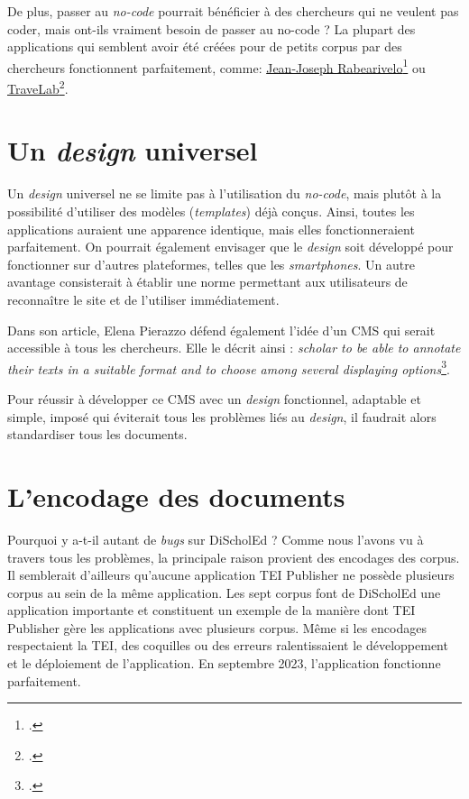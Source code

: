 De plus, passer au \textit{no-code} pourrait bénéficier à des chercheurs qui ne veulent pas coder, mais ont-ils vraiment besoin de passer au no-code ? La plupart des applications qui semblent avoir été créées pour de petits corpus par des chercheurs fonctionnent parfaitement, comme: \href{https://rabearivelo.huma-num.fr/exist/apps/jjr/index.html}{Jean-Joseph Rabearivelo\footcite{JJR}} ou \href{https://teipublisher.info/exist/apps/TraveLab/index.html}{TraveLab\footcite{TraveLab}}.

\section{Un \textit{design} universel} 

Un \textit{design} universel ne se limite pas à l'utilisation du \textit{no-code}, mais plutôt à la possibilité d'utiliser des modèles (\textit{templates}) déjà conçus. Ainsi, toutes les applications auraient une apparence identique, mais elles fonctionneraient parfaitement. On pourrait également envisager que le \textit{design} soit développé pour fonctionner sur d'autres plateformes, telles que les \textit{smartphones}. Un autre avantage consisterait à établir une norme permettant aux utilisateurs de reconnaître le site et de l'utiliser immédiatement.

Dans son article, Elena Pierazzo défend également l'idée d'un CMS qui serait accessible à tous les chercheurs. Elle le décrit ainsi : \og{}\textit{scholar to be able to annotate their texts in a suitable format and to choose among several displaying options}\fg{}\footcite{epapers4200}.

Pour réussir à développer ce CMS avec un \textit{design} fonctionnel, adaptable et simple, imposé qui éviterait tous les problèmes liés au \textit{design}, il faudrait alors standardiser tous les documents.

\section{L'encodage des documents}

Pourquoi y a-t-il autant de \textit{bugs} sur DiScholEd ? Comme nous l'avons vu à travers tous les problèmes, la principale raison provient des encodages des corpus. Il semblerait d'ailleurs qu'aucune application TEI Publisher ne possède plusieurs corpus au sein de la même application. Les sept corpus font de DiScholEd une application importante et constituent un exemple de la manière dont TEI Publisher gère les applications avec plusieurs corpus. Même si les encodages respectaient la TEI, des coquilles ou des erreurs ralentissaient le développement et le déploiement de l'application. En septembre 2023, l'application fonctionne parfaitement.

